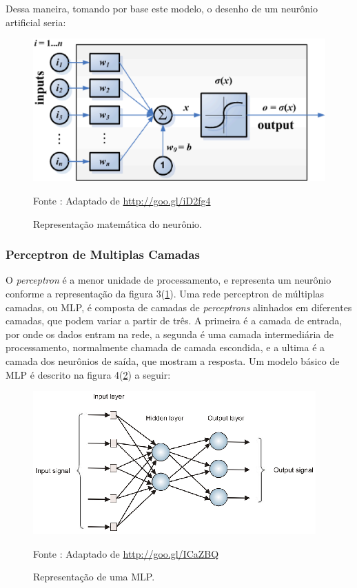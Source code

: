     Dessa maneira, tomando por base este modelo, o desenho de um neurônio artificial seria:

    \begin{figure}[ht]
        \centering
        \label{fig03}
            \includegraphics[keepaspectratio=true, scale=0.27]{editaveis/images/modeloNeuronio.eps}
        \caption{Representação matemática do neurônio.}
        Fonte : Adaptado de \url{http://goo.gl/iD2fg4}
    \end{figure}
    \newpage

\subsubsection{Perceptron de Multiplas Camadas}
    O \textit{perceptron} é a menor unidade de processamento, e representa um neurônio conforme a representação da figura 3(\ref{fig03}). Uma rede perceptron de múltiplas camadas, ou MLP, é composta de camadas de \textit{perceptrons} alinhados em diferentes camadas, que podem variar a partir de três. A primeira é a camada de entrada, por onde os dados entram na rede, a segunda é uma camada intermediária de processamento, normalmente chamada de camada escondida, e a ultima é a camada dos neurônios de saída, que mostram a resposta. Um modelo básico de MLP é descrito na figura 4(\ref{fig04}) a seguir:

    \begin{figure}[ht]
        \centering
        \label{fig04}
            \includegraphics[keepaspectratio=true, scale=2.1]{editaveis/images/mlp.eps}
        \caption{Representação de uma MLP.}
        Fonte : Adaptado de \url{http://goo.gl/ICaZBQ}
    \end{figure}


